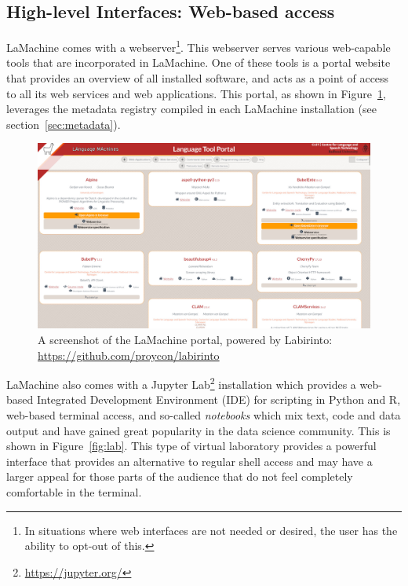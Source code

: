 \documentclass[a4paper,11pt]{article}
\begin{document}
\subsection{High-level Interfaces: Web-based access}

LaMachine comes with a webserver\footnote{In situations where web interfaces are not needed or desired, the
user has the ability to opt-out of this.}. This webserver serves various web-capable tools that are incorporated in LaMachine. One
of these tools is a portal website that provides an overview of all installed software, and acts as a point of access to
all its web services and web applications. This portal, as shown in
Figure~\ref{fig:portal}, leverages the metadata registry compiled in each LaMachine installation (see
section~\ref{sec:metadata}).

\begin{figure}[htb] \begin{center}
\includegraphics[width=135.0mm]{screenshot_portal.jpg}
\end{center}
\caption{\footnotesize{A screenshot of the LaMachine portal, powered by Labirinto:
\url{https://github.com/proycon/labirinto}}}
\label{fig:portal}
\end{figure}

LaMachine also comes with a
Jupyter Lab\footnote{\url{https://jupyter.org/}} installation which provides a web-based Integrated Development
Environment (IDE) for scripting in Python and R, web-based terminal access, and so-called \emph{notebooks} which mix
text, code and data output and have gained great popularity in the data science community. This is shown in
Figure~\ref{fig:lab}. This type of virtual laboratory provides a powerful interface that provides an alternative to
regular shell access and may have a larger appeal for those parts of the audience that do not feel completely
comfortable in the terminal.
\end{document}

